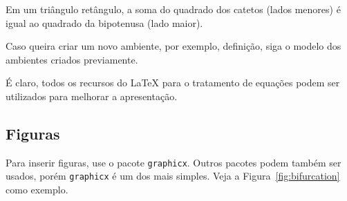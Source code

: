 \begin{pf}    %
Em um triângulo retângulo, a soma do quadrado dos catetos (lados menores) é igual ao quadrado da bipotenusa (lado maior). 
\end{pf}
\fi

Caso queira criar um novo ambiente, por exemplo, definição, siga o modelo dos ambientes 
criados previamente.



É claro, todos os recursos do {\LaTeX} para o tratamento de equações podem
ser utilizados para melhorar a apresentação. 

\subsection{Figuras}

Para inserir figuras, use o pacote \texttt{graphicx}. Outros pacotes podem
também ser usados, porém  \texttt{graphicx} é um dos mais simples. Veja
a Figura~\ref{fig:bifurcation} como exemplo. 



